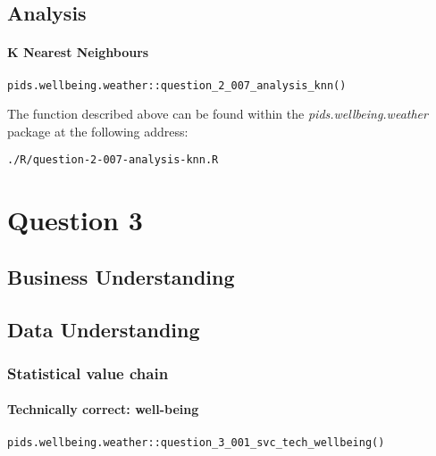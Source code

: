 \documentclass[12pt, oneside, openany]{book}
\begin{document}
\section*{Analysis}

\subsubsection*{K Nearest Neighbours}


\begin{verbatim}
pids.wellbeing.weather::question_2_007_analysis_knn()
\end{verbatim}
 
The function described above can be found within the \emph{pids.wellbeing.weather} package at the following address:

\begin{verbatim}
./R/question-2-007-analysis-knn.R
\end{verbatim}

\setcounter{equation}{0}
\chapter*{Question 3}

\section*{Business Understanding}

\section*{Data Understanding}

\subsection*{Statistical value chain}

\subsubsection*{Technically correct: well-being}

\begin{verbatim}
pids.wellbeing.weather::question_3_001_svc_tech_wellbeing()
\end{verbatim}
\end{document}
